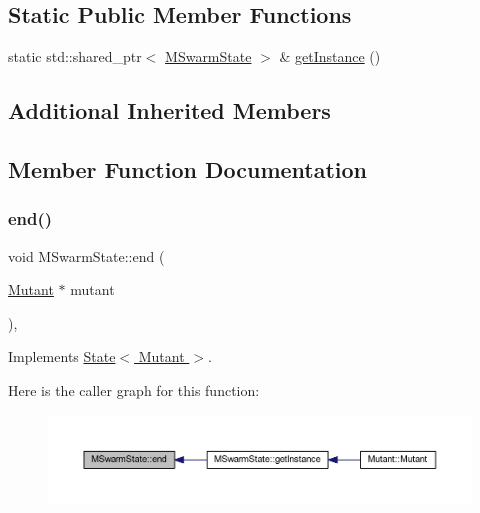 \subsection*{Static Public Member Functions}
\begin{DoxyCompactItemize}
\item 
static std\+::shared\+\_\+ptr$<$ \hyperlink{class_m_swarm_state}{M\+Swarm\+State} $>$ \& \hyperlink{class_m_swarm_state_a34e48cde060647067f9990ee914b6dfd}{get\+Instance} ()
\end{DoxyCompactItemize}
\subsection*{Additional Inherited Members}


\subsection{Member Function Documentation}
\mbox{\label{class_m_swarm_state_aa9ac4ceacb0282421abcbf7fa1d6f217}} 
\subsubsection{\texorpdfstring{end()}{end()}}
{\footnotesize\ttfamily void M\+Swarm\+State\+::end (\begin{DoxyParamCaption}\item[{\hyperlink{class_mutant}{Mutant} $\ast$}]{mutant }\end{DoxyParamCaption})\hspace{0.3cm}{\ttfamily [override]}, {\ttfamily [virtual]}}



Implements \hyperlink{class_state_a97d058722f988c008e912a0e5ec879b3}{State$<$ Mutant $>$}.

Here is the caller graph for this function\+:
\nopagebreak
\begin{figure}[H]
\begin{center}
\leavevmode
\includegraphics[width=350pt]{class_m_swarm_state_aa9ac4ceacb0282421abcbf7fa1d6f217_icgraph}
\end{center}
\end{figure}
\mbox{\label{class_m_swarm_state_a34e48cde060647067f9990ee914b6dfd}} 
